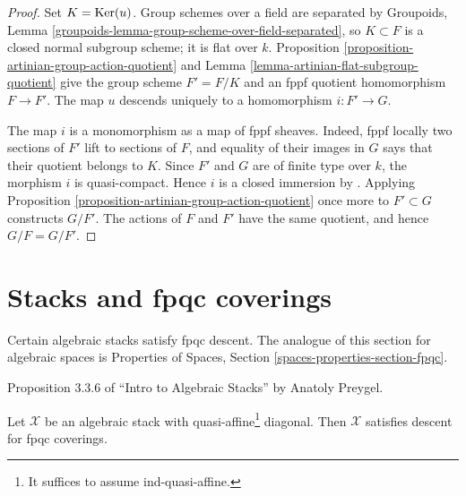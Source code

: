\begin{proof}
Set $K = \mathop{\mathrm{Ker}}(u)$. Group schemes over a field are separated by Groupoids,
Lemma \ref{groupoids-lemma-group-scheme-over-field-separated}, so
$K \subset F$ is a closed normal subgroup scheme; it is flat over $k$.
Proposition
\ref{proposition-artinian-group-action-quotient} and Lemma
\ref{lemma-artinian-flat-subgroup-quotient} give the group scheme
$F' = F/K$ and an fppf quotient homomorphism $F \to F'$. The map $u$
descends uniquely to a homomorphism $i : F' \to G$.

The map $i$ is a monomorphism as a map of fppf sheaves. Indeed, fppf
locally two sections of $F'$ lift to sections of $F$, and equality of
their images in $G$ says that their quotient belongs to $K$. Since
$F'$ and $G$ are of finite type over $k$, the morphism $i$ is
quasi-compact. Hence $i$ is a closed immersion by
\cite[Expos\'e VI$_B$, Corollaire 1.4.2]{SGA3}. Applying Proposition
\ref{proposition-artinian-group-action-quotient} once more to
$F' \subset G$ constructs $G/F'$. The actions of $F$ and $F'$ have the
same quotient, and hence $G/F = G/F'$.
\end{proof}




\section{Stacks and fpqc coverings}
\label{section-fpqc}

\noindent
Certain algebraic stacks satisfy fpqc descent.
The analogue of this section for algebraic spaces
is Properties of Spaces, Section \ref{spaces-properties-section-fpqc}.


\begin{proposition}
\label{proposition-stack-fpqc}
\begin{reference}
Proposition 3.3.6 of ``Intro to Algebraic Stacks'' by
Anatoly Preygel.
\end{reference}
Let $\mathcal{X}$ be an algebraic stack with quasi-affine\footnote{It suffices
to assume ind-quasi-affine.} diagonal. Then
$\mathcal{X}$ satisfies descent for fpqc coverings.
\end{proposition}

